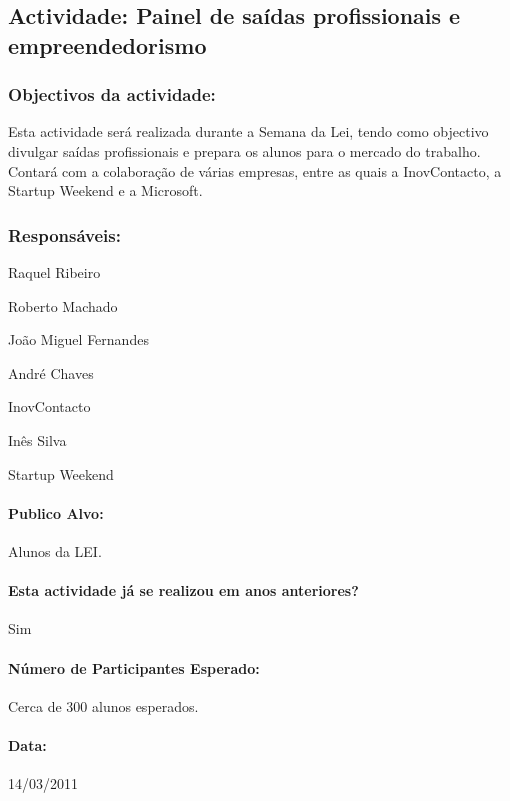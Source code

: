 \subsection{Actividade: Painel de saídas profissionais e empreendedorismo} %

\subsubsection*{Objectivos da actividade:}
Esta actividade será realizada durante a Semana da Lei, tendo como objectivo divulgar saídas profissionais e prepara os alunos para o mercado do trabalho. Contará com a colaboração de várias empresas, entre as quais a InovContacto, a Startup Weekend e a Microsoft.

\subsubsection*{Responsáveis:}
\begin{itemizedash}
	\item{Raquel Ribeiro}
	\item{Roberto Machado}
	\item{João Miguel Fernandes}
	\item{André Chaves}
	\item{InovContacto}
	\item{Inês Silva}
	\item{Startup Weekend}
\end{itemizedash}

\paragraph{Publico Alvo: }
Alunos da LEI.

\paragraph{Esta actividade já se realizou em anos anteriores?}
Sim

\paragraph{Número de Participantes Esperado:}
Cerca de 300 alunos esperados.

\paragraph{Data:} 14/03/2011

